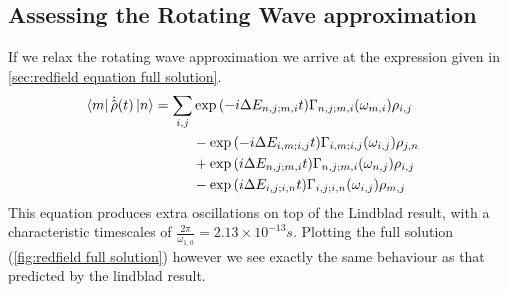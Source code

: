 \subsection{Assessing the Rotating Wave approximation}
If we relax the rotating wave approximation
we arrive at the expression given in \cref{sec:redfield equation full solution}.
\begin{align}
    \bra{m}\dot{\hat{\rho{}}}(t) \ket{n} & = \begin{aligned}[t]
        \sum_{i,j} &
        \exp{(-i\Delta{}E_{n,j;m,i} t)}
        \Gamma_{n,j;m, i}(\omega_{m,i})
        \rho_{i,j}   \\
                   &
        -\exp{(-i\Delta{}E_{i,m;i,j} t)}
        \Gamma_{i,m;i, j}(\omega_{i,j})
        \rho_{j, n}  \\
                   &
        +\exp{(i\Delta{}E_{n,j;m,i} t)}
        \Gamma_{n,j; m, i}(\omega_{n,j})
        \rho_{i, j}  \\
                   &
        -\exp{(i\Delta{}E_{i,j;i,n} t)}
        \Gamma_{i,j; i, n}(\omega_{i,j})
        \rho_{m, j}
    \end{aligned}
\end{align}
This equation produces extra oscillations
on top of the Lindblad result, with
a characteristic timescales of
\(\frac{2\pi}{\omega_{1,0}} = 2.13\times{}10^{-13}s\). Plotting
the full solution (\cref{fig:redfield full solution})
however we see exactly the same behaviour as that
predicted by the lindblad result.


